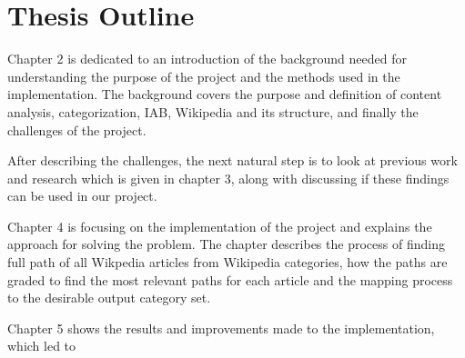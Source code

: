 \section{Thesis Outline}
Chapter 2 is dedicated to an introduction of the background needed for understanding the purpose of the project and the methods used in the implementation. The background covers the purpose and definition of content analysis, categorization, IAB, Wikipedia and its structure, and finally the challenges of the project. 

After describing the challenges, the next natural step is to look at previous work and research which is given in chapter 3, along with discussing if these findings can be used in our project. 

Chapter 4 is focusing on the implementation of the project and explains the approach for solving the problem. The chapter describes the process of finding full path of all Wikpedia articles from Wikipedia categories, how the paths are graded to find the most relevant paths for each article and the mapping process to the desirable output category set. 

Chapter 5 shows the results and improvements made to the implementation, which led to  